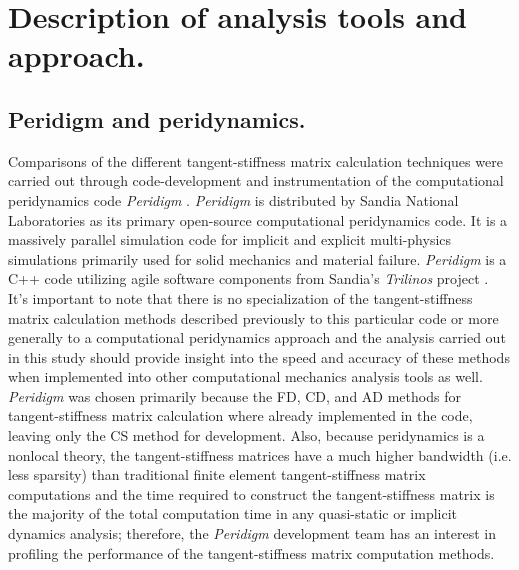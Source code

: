 \documentclass[preprint,12pt]{elsarticle}
\begin{document}
\section{Description of analysis tools and approach.} 
%
\subsection{Peridigm and peridynamics.}
\label{subsec:PaP}
%
Comparisons of the different tangent-stiffness matrix calculation techniques were carried out through code-development and instrumentation of the computational peridynamics code \emph{Peridigm} \cite{peridigm}.  \emph{Peridigm} is distributed by Sandia National Laboratories as its primary open-source computational peridynamics code. It is a massively parallel simulation code for implicit and explicit multi-physics simulations primarily used for solid mechanics and material failure. \emph{Peridigm} is a C++ code utilizing agile software components from Sandia's \emph{Trilinos} project \cite{trilinos}. It's important to note that there is no specialization of the tangent-stiffness matrix calculation methods described previously to this particular code or more generally to a computational peridynamics approach and the analysis carried out in this study should provide insight into the speed and accuracy of these methods when implemented into other computational mechanics analysis tools as well.  \emph{Peridigm} was chosen primarily because the FD, CD, and AD methods for tangent-stiffness matrix calculation where already implemented in the code, leaving only the CS method for development. Also, because peridynamics is a nonlocal theory, the tangent-stiffness matrices have a much higher bandwidth (i.e. less sparsity) than traditional finite element tangent-stiffness matrix computations and the time required to construct the tangent-stiffness matrix is the majority of the total computation time in any quasi-static or implicit dynamics analysis; therefore, the \emph{Peridigm} development team has an interest in profiling the performance of the tangent-stiffness matrix computation methods.
\end{document}
